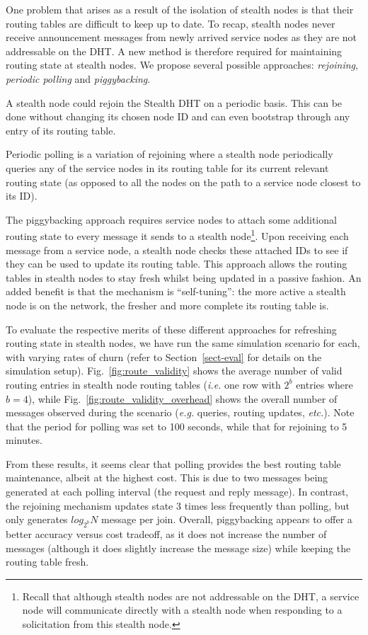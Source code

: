 \documentclass[letterpaper]{sig-alternate} %
\begin{document}
One problem that arises as a result of the isolation of stealth
nodes is that their routing tables are difficult to keep up to date.
To recap, stealth nodes never receive announcement messages from
newly arrived service nodes as they are not addressable on the DHT.
A new method is therefore required for maintaining routing state at
stealth nodes. We propose several possible approaches: {\em
rejoining}, {\em periodic polling} and {\em piggybacking}.

A stealth node could rejoin the Stealth DHT on a periodic basis. This can be
done without changing its chosen node ID and can even bootstrap through any
entry of its routing table.

Periodic polling is a variation of rejoining where a stealth node
periodically queries any of the service nodes in its routing table
for its current relevant routing state (as opposed to all the nodes
on the path to a service node closest to its ID).

The piggybacking approach requires service nodes to attach some
additional routing state to every message it sends to a stealth
node\footnote{Recall that although stealth nodes are not addressable on
the DHT, a service node will communicate directly with a stealth node
when responding to a solicitation from this stealth node.}. Upon
receiving each message from a service node, a stealth node checks these
attached IDs to see if they can be used to update its routing table.
This approach allows the routing tables in stealth nodes to stay fresh
whilst being updated in a passive fashion. An added benefit is that the
mechanism is ``self-tuning'': the more active a stealth node is on the
network, the fresher and more complete its routing table is.

To evaluate the respective merits of these different approaches for refreshing
routing state in stealth nodes, we have run the same simulation scenario for
each, with varying rates of churn (refer to Section~\ref{sect-eval} for details
on the simulation setup). Fig.~\ref{fig:route_validity} shows the average
number of valid routing entries in stealth node routing tables (\emph{i.e.} one
row with $2^b$ entries where $b = 4$), while
Fig.~\ref{fig:route_validity_overhead} shows the overall number of messages
observed during the scenario (\emph{e.g.} queries, routing updates,
\emph{etc.}). Note that the period for polling was set to 100 seconds, while
that for rejoining to 5 minutes.

From these results, it seems clear that polling provides the best routing table
maintenance, albeit at the highest cost. This is due to two messages being
generated at each polling interval (the request and reply message). In
contrast, the rejoining mechanism updates state 3 times less frequently than
polling, but only generates $log_{2^b}N$ message per join. Overall,
piggybacking appears to offer a better accuracy versus cost tradeoff, as it
does not increase the number of messages (although it does slightly increase
the message size) while keeping the routing table fresh.
\end{document}
